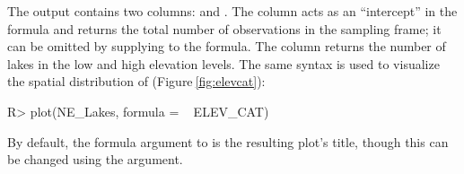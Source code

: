 \documentclass[
  shortnames]{jss}
\begin{document}
The output contains two columns:  and . The
 column acts as an ``intercept'' in the formula and returns
the total number of observations in the sampling frame; it can be
omitted by supplying  to the formula. The 
column returns the number of lakes in the low and high elevation levels.
The same syntax is used to visualize the spatial distribution of
 (Figure\(~\)\ref{fig:elevcat}):

\begin{CodeChunk}
\begin{CodeInput}
R> plot(NE_Lakes, formula = ~ ELEV_CAT)
\end{CodeInput}
\end{CodeChunk}

By default, the formula argument to  is the resulting
plot's title, though this can be changed using the  argument.
\end{document}
